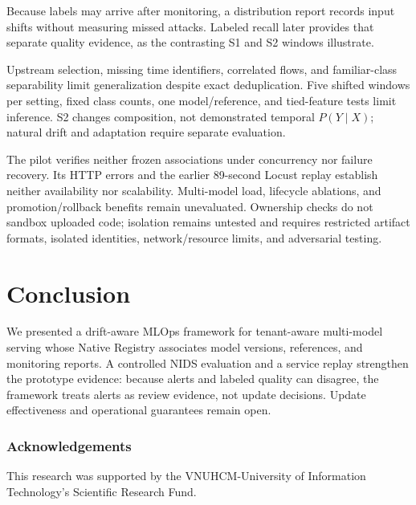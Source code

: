 \documentclass[runningheads]{llncs}
\begin{document}
Because labels may arrive after monitoring, a distribution report records input shifts without measuring missed attacks. Labeled recall later provides that separate quality evidence, as the contrasting S1 and S2 windows illustrate.

Upstream selection, missing time identifiers, correlated flows, and familiar-class separability limit generalization despite exact deduplication. Five shifted windows per setting, fixed class counts, one model/reference, and tied-feature tests limit inference. S2 changes composition, not demonstrated temporal $P(Y\mid X)$; natural drift and adaptation require separate evaluation.

The pilot verifies neither frozen associations under concurrency nor failure recovery. Its HTTP errors and the earlier 89-second Locust replay establish neither availability nor scalability. Multi-model load, lifecycle ablations, and promotion/rollback benefits remain unevaluated. Ownership checks do not sandbox uploaded code; isolation remains untested and requires restricted artifact formats, isolated identities, network/resource limits, and adversarial testing.

\section{Conclusion}
We presented a drift-aware MLOps framework for tenant-aware multi-model serving whose Native Registry associates model versions, references, and monitoring reports. A controlled NIDS evaluation and a service replay strengthen the prototype evidence: because alerts and labeled quality can disagree, the framework treats alerts as review evidence, not update decisions. Update effectiveness and operational guarantees remain open.


\subsubsection*{Acknowledgements}
This research was supported by the VNUHCM-University of Information Technology's Scientific Research Fund.
\end{document}
